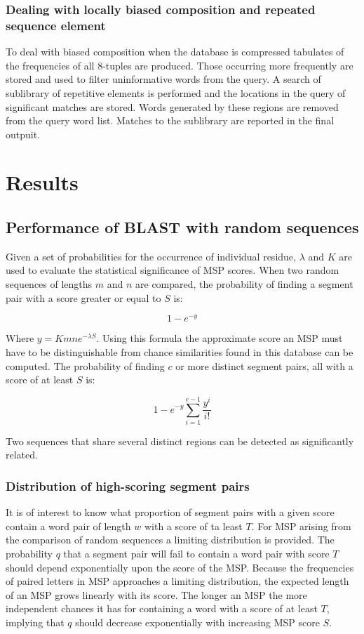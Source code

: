 		\subsubsection{Dealing with locally biased composition and repeated sequence element}
		To deal with biased composition when the database is compressed tabulates of the frequencies of all $8$-tuples are produced.
		Those occurring more frequently are stored and used to filter uninformative words from the query.
		A search of sublibrary of repetitive elements is performed and the locations in the query of significant matches are stored.
		Words generated by these regions are removed from the query word list.
		Matches to the sublibrary are reported in the final outpuit.

\section{Results}

	\subsection{Performance of BLAST with random sequences}
	Given a set of probabilities for the occurrence of individual residue, $\lambda$ and $K$ are used to evaluate the statistical significance of MSP scores.
	When two random sequences of lengths $m$ and $n$ are compared, the probability of finding a segment pair with a score greater or equal to $S$ is:

	$$1-e^{-y}$$

	Where $y = Kmne^{-\lambda S}$.
	Using this formula the approximate score an MSP must have to be distinguishable from chance similarities found in this database can be computed.
	The probability of finding $c$ or more distinct segment pairs, all with a score of at least $S$ is:

	$$1-e^{-y}\sum\limits_{i=1}^{c-1}\frac{y^i}{i!}$$

	Two sequences that share several distinct regions can be detected as significantly related.

		\subsubsection{Distribution of high-scoring segment pairs}
		It is of interest to know what proportion of segment pairs with a given score contain a word pair of length $w$ with a score of ta least $T$.
		For MSP arising from the comparison of random sequences a limiting distribution is provided.
		The probability $q$ that a segment pair will fail to contain a word pair with score $T$ should depend exponentially upon the score of the MSP.
		Because the frequencies of paired letters in MSP approaches a limiting distribution, the expected length of an MSP grows linearly with its score.
		The longer an MSP the more independent chances it has for containing a word with a score of at least $T$, implying that $q$ should decrease exponentially with increasing MSP score $S$.

